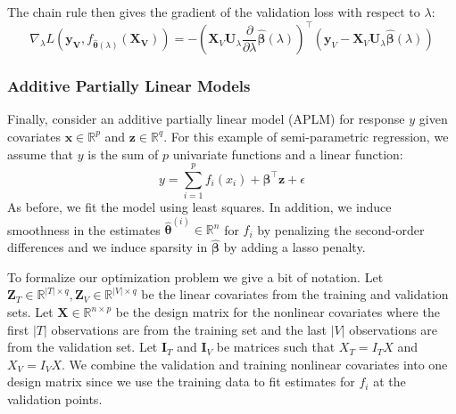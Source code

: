 \documentclass[12pt,letterpaper]{article}
\begin{document}
The chain rule then gives the gradient of the validation loss with respect to $\lambda$:
\begin{equation}
\nabla_{\lambda} L(\boldsymbol{y_V}, f_{\hat{\boldsymbol{\theta}}(\lambda)}(\boldsymbol{X_V})) = 
- \left (
\boldsymbol{X}_V \boldsymbol U_\lambda
\frac{\partial}{\partial \lambda} \hat{\boldsymbol \beta}(\lambda)
\right )^\top
\left (
\boldsymbol{y}_V - \boldsymbol{X}_V \boldsymbol U_\lambda \hat{\boldsymbol{\beta}} (\lambda)
\right )
\end{equation}


\subsubsection{Additive Partially Linear Models}\label{sec:additive}

Finally, consider an additive partially linear model (APLM) for response $y$ given covariates $\boldsymbol{x} \in \mathbb{R}^p$ and $\boldsymbol{z} \in \mathbb{R}^q$. For this example of semi-parametric regression, we assume that $y$ is the sum of $p$ univariate functions and a linear function:
\begin{equation}
y = \sum_{i=1}^p f_i(x_i) + \boldsymbol{\beta}^\top \boldsymbol z  + \epsilon
\end{equation}
As before, we fit the model using least squares. In addition, we induce smoothness in the estimates $\hat{\boldsymbol{\theta}}^{(i)} \in \mathbb{R}^n$ for $f_i$ by penalizing the second-order differences and we induce sparsity in $\hat{\boldsymbol{\beta}}$ by adding a lasso penalty.

To formalize our optimization problem we give a bit of notation. Let $\boldsymbol{Z}_T \in \mathbb{R}^{|T| \times q}, \boldsymbol{Z}_V \in \mathbb{R}^{|V| \times q}$ be the linear covariates from the training and validation sets. Let $\boldsymbol X \in \mathbb{R}^{n \times p}$ be the design matrix for the nonlinear covariates where the first $|T|$ observations are from the training set and the last $|V|$ observations are from the validation set. Let $\boldsymbol{I}_T$ and $\boldsymbol{I}_V$ be matrices such that $X_T = I_T X$ and $X_V = I_V X$. We combine the validation and training nonlinear covariates into one design matrix since we use the training data to fit estimates for $f_i$ at the validation points. 
\end{document}
